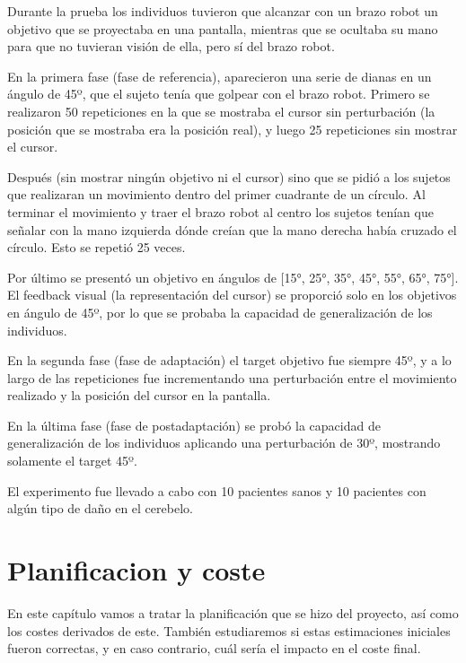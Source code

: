 \documentclass[a4paper,11pt, oneside]{book}
\begin{document}
Durante la prueba los individuos tuvieron que alcanzar con un brazo robot un objetivo que se proyectaba en una pantalla, mientras que se ocultaba su mano para que no tuvieran visión de ella, pero sí del brazo robot. 

En la primera fase (fase de referencia), aparecieron una serie de dianas en un ángulo de 45º, que el sujeto tenía que golpear con el brazo robot. Primero se realizaron 50 repeticiones en la que se mostraba el cursor sin perturbación (la posición que se mostraba era la posición real), y luego 25 repeticiones sin mostrar el cursor.

Después (sin mostrar ningún objetivo ni el cursor) sino que se pidió a los sujetos que realizaran un movimiento dentro del primer cuadrante de un círculo. Al terminar el movimiento y traer el brazo robot al centro los sujetos tenían que señalar con la mano izquierda dónde creían que la mano derecha había cruzado el círculo. Esto se repetió 25 veces.

Por último se presentó un objetivo en ángulos de [15°, 25°, 35°, 45°, 55°, 65°, 75°]. El feedback visual (la representación del cursor) se proporció solo en los objetivos en ángulo de 45º, por lo que se probaba la capacidad de generalización de los individuos.

En la segunda fase (fase de adaptación) el target objetivo fue siempre 45º, y a lo largo de las repeticiones fue incrementando una perturbación entre el movimiento realizado y la posición del cursor en la pantalla. 

En la última fase (fase de postadaptación) se probó la capacidad de generalización de los individuos aplicando una perturbación de 30º, mostrando solamente el target 45º.

El experimento fue llevado a cabo con 10 pacientes sanos y 10 pacientes con algún tipo de daño en el cerebelo.

\chapter{Planificacion y coste}


En este capítulo vamos a tratar la planificación que se hizo del proyecto, así como los costes derivados de este. También estudiaremos si estas estimaciones iniciales fueron correctas, y en caso contrario, cuál sería el impacto en el coste final.
\end{document}
